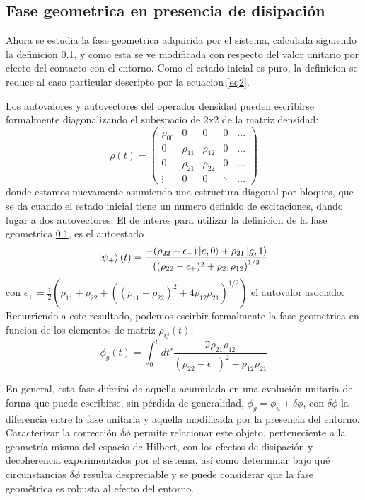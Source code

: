 \subsection{Fase geometrica en presencia de disipación}
Ahora se estudia la fase geometrica adquirida por el sistema, calculada siguiendo la definicion \ref{}, y como esta se ve modificada con respecto del valor unitario por efecto del contacto con el entorno. Como el estado inicial es puro, la definicion se reduce al caso particular descripto por la ecuacion \ref{eq2}.

Los autovalores y autovectores del operador densidad pueden escribirse formalmente  diagonalizando el subespacio de 2x2 de la matriz densidad:
\begin{equation}
    \rho(t)=\begin{pmatrix}
        \rho_{00} & 0 & 0 & 0 &\dots \\
        0 & \rho_{11} & \rho_{12} & 0 & \dots \\
        0 & \rho_{21} & \rho_{22} & 0 & \dots \\ 
        \vdots & 0 & 0 & \ddots & \dots 
    \end{pmatrix}
\end{equation}
donde estamos nuevamente asumiendo una estructura diagonal por bloques, que se da cuando el estado inicial tiene un numero definido de escitaciones, dando lugar a dos autovectores. El de interes para utilizar la definicion de la fase geometrica \ref{}, es el autoestado
\begin{equation}
    \ket{\psi_+}(t)=\frac{-(\rho_{22}-\epsilon_+)\ket{e,0}+\rho_{21}\ket{g,1}}{\left((\rho_{22}-\epsilon_+)^2+\rho_{21}\rho_{12} \right)^{1/2}}
\end{equation}
con $\epsilon_+=\frac{1}{2}(\rho_{11}+\rho_{22}+((\rho_{11}-\rho_{22})^2+4\rho_{12}\rho_{21})^{1/2})$ el autovalor asociado. Recurriendo a este resultado, podemos escirbir formalmente la fase geometrica en funcion de los elementos de matriz $\rho_{ij}(t)$:
\begin{equation}
    \phi_g(t)=\int_0^t dt' \frac{\Im \dot\rho_{21}\rho_{12}}{(\rho_{22}-\epsilon_+)^2+\rho_{12}\rho_{21}}
\end{equation}

En general, esta fase diferirá de aquella acumulada en una evolución unitaria de forma que puede
escribirse, sin pérdida de generalidad, $\phi_g=\phi_u+\delta\phi$, con $\delta\phi$ la diferencia entre la fase unitaria y
aquella modificada por la presencia del entorno. Caracterizar la corrección $\delta\phi$ permite relacionar este
objeto, perteneciente a la geometría misma del espacio de Hilbert, con los efectos de disipación y
decoherencia experimentados por el sistema, así como determinar bajo qué circunstancias $\delta\phi$ resulta
despreciable y se puede considerar que la fase geométrica es robusta al efecto del entorno.

